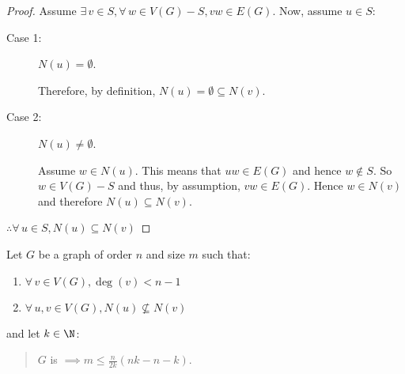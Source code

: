 \begin{proof}
  Assume \(\exists\,v\in S,\forall\,w\in V(G)-S,vw\in E(G)\).  Now, assume \(u\in S\):
  \begin{description}
  \item[Case 1:] \(N(u)=\emptyset\).
      
    Therefore, by definition, \(N(u)=\emptyset\subseteq N(v)\).

  \item[Case 2:] \(N(u)\ne\emptyset\).

    Assume \(w\in N(u)\).  This means that \(uw\in E(G)\) and hence \(w\notin S\).  So \(w\in V(G)-S\) and thus, by assumption,
    \(vw\in E(G)\). Hence \(w\in N(v)\) and therefore \(N(u)\subseteq N(v)\).
  \end{description}

  \(\therefore\forall\,u\in S,N(u)\subseteq N(v)\)
\end{proof}

\begin{lemma}
  \label{lem:tighter}
  Let \(G\) be a graph of order \(n\) and size \(m\) such that:
  \begin{enumerate}
  \item \(\forall\,v\in V(G),\deg(v)<n-1\)
  \item \(\forall\,u,v\in V(G),N(u)\not\subseteq N(v)\)
  \end{enumerate}
  and let \(k\in\N\):
  \begin{quote}
    \(G\) is  \(\displaystyle\implies m\le\frac{n}{2k}(nk-n-k)\).
  \end{quote}
\end{lemma}

